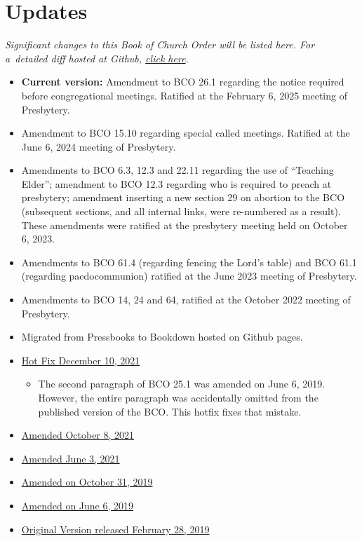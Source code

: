 \documentclass[
]{book}
\providecommand{\tightlist}{%
  \setlength{\itemsep}{0pt}\setlength{\parskip}{0pt}}
\begin{document}
\hypertarget{updates}{%
\chapter*{Updates}\label{updates}}

\emph{Significant changes to this Book of Church Order will be listed here. For a~detailed diff hosted at Github, \href{https://github.com/Evangel-Presbytery/evangel-bco}{click here}.}

\begin{itemize}
\tightlist
\item
  \textbf{Current version:} Amendment to BCO 26.1 regarding the notice required before congregational meetings. Ratified at the February 6, 2025 meeting of Presbytery.
\item
  Amendment to BCO 15.10 regarding special called meetings. Ratified at the June 6, 2024 meeting of Presbytery.
\item
  Amendments to BCO 6.3, 12.3 and 22.11 regarding the use of ``Teaching Elder''; amendment to BCO 12.3 regarding who is required to preach at presbytery; amendment inserting a new section 29 on abortion to the BCO (subsequent sections, and all internal links, were re-numbered as a result). These amendments were ratified at the presbytery meeting held on October 6, 2023.
\item
  Amendments to BCO 61.4 (regarding fencing the Lord's table) and BCO 61.1 (regarding paedocommunion) ratified at the June 2023 meeting of Presbytery.
\item
  Amendments to BCO 14, 24 and 64, ratified at the October 2022 meeting of Presbytery.
\item
  Migrated from Pressbooks to Bookdown hosted on Github pages.
\item
  \href{https://www.dropbox.com/sh/e5lszl09qec2wy0/AADMEzOS1C1Z7Ao4r4xyddHNa?dl=0}{Hot Fix December 10, 2021}

  \begin{itemize}
  \tightlist
  \item
    The second paragraph of BCO 25.1 was amended on June 6, 2019. However, the entire paragraph was accidentally omitted from the published version of the BCO. This hotfix fixes that mistake.
  \end{itemize}
\item
  \href{https://www.dropbox.com/sh/67fg23e5sksui6j/AAB6LRjZ2dld47gYz1G0jo-Fa?dl=0}{Amended October 8, 2021}
\item
  \href{https://www.dropbox.com/sh/z9buy77lg1ay8t0/AAAnPPQysyhwRPJ7lpLxl3Bma?dl=0}{Amended June 3, 2021}
\item
  \href{https://www.dropbox.com/sh/yhg7o7s6vlx0jha/AABM5so3BTahNcU7rUWsZHAGa?dl=0}{Amended on October 31, 2019}
\item
  \href{https://www.dropbox.com/sh/6e1mcd2n8vojvpv/AADWRZsciqNw1xteiuRA0lr3a?dl=0}{Amended on June 6, 2019}
\item
  \href{https://www.dropbox.com/sh/w46pitp7sevpepk/AAAH_HDpb8Qpck42Dkfw661Za?dl=0}{Original Version released February 28, 2019}
\end{itemize}
\end{document}

